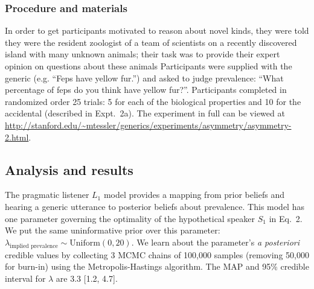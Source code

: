 \documentclass[12pt,letterpaper]{article}
\begin{document}
\subsubsection*{Procedure and materials}

In order to get participants motivated to reason about novel kinds, they were told they were the resident zoologist of a team of scientists on a recently discovered island with many unknown animals; their task was to provide their expert opinion on questions about these animals
Participants were supplied with the generic (e.g. ``Feps have yellow fur.'') and asked to judge prevalence: ``What percentage of feps do you think have yellow fur?''. 
Participants completed in randomized order 25 trials: 5 for each of the biological properties and 10 for the accidental (described in Expt.~2a).
The experiment in full can be viewed at \url{http://stanford.edu/~mtessler/generics/experiments/asymmetry/asymmetry-2.html}. 

\subsection*{Analysis and results}

The pragmatic listener $L_1$ model provides a mapping from prior beliefs and hearing a generic utterance to posterior beliefs about prevalence.
This model has one parameter governing the optimality of the hypothetical speaker $S_1$ in Eq.~2. 
We put the same uninformative prior over this parameter: $\lambda_{\text{implied prevalence}} \sim \text{Uniform}(0, 20)$.
We learn about the parameter's \emph{a posteriori} credible values by collecting 3 MCMC chains of 100,000 samples (removing 50,000 for burn-in) using the Metropolis-Hastings algorithm. The MAP and 95\% credible interval for $\lambda$ are 3.3 [1.2, 4.7].
\end{document}
